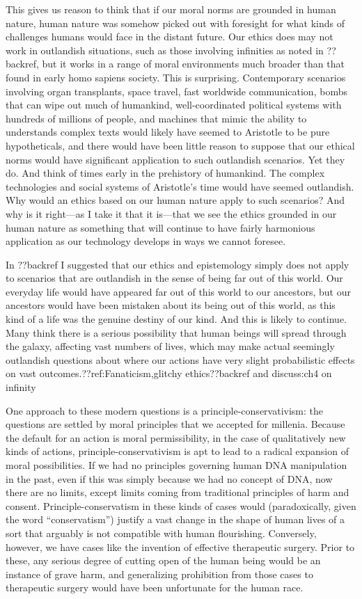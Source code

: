 This gives us reason to think that if our moral norms are grounded in human nature, human nature was somehow
picked out with foresight for what kinds of challenges humans would face in the distant future. Our ethics
does may not work in outlandish situations, such as those involving infinities as noted in ??backref, but it works in a
range of moral environments much broader than that found in early homo sapiens society. This is surprising. 
Contemporary scenarios involving organ transplants, space travel, fast worldwide communication, bombs that can wipe out
much of humankind, well-coordinated political systems with hundreds of millions of people, and machines that mimic 
the ability to understands complex texts 
would likely have seemed to Aristotle to be pure hypotheticals, and there would have been little reason to suppose
that our ethical norms would have significant application to such outlandish scenarios. Yet they do. And think of
times early in the prehistory of humankind. The complex technologies and social systems
of Aristotle's time would have seemed outlandish. Why would an ethics based on our human nature apply to such
scenarios? And why is it right---as I take it that it is---that we see the ethics grounded in our human nature 
as something that will continue to have fairly harmonious application as our technology develops in ways we cannot 
foresee. 

In ??backref I suggested that our ethics and epistemology simply does not apply to scenarios that are outlandish
in the sense of being far out of this world.  Our everyday life would have appeared far out of this world to our 
ancestors, but our ancestors would have been mistaken about its being out of this world, as this kind of a life 
was the genuine destiny of our kind. And this is likely to continue. Many think there is a serious possibility 
that human beings will spread through the galaxy, affecting vast numbers of lives, which may make actual seemingly 
outlandish questions about where our actions have very slight probabilistic effects on vast outcomes.??ref:Fanaticism,glitchy ethics??backref and discuss:ch4 on infinity

One approach to these modern questions is a principle-conservativism: the questions are settled by moral principles that we accepted
for millenia. Because the default for an action is moral permissibility, in the case of qualitatively new kinds of actions, 
principle-conservativism is apt to lead to a radical expansion of moral possibilities. If we had no principles governing human DNA
manipulation in the past, even if this was simply because we had no concept of DNA, now there are no limits, except limits coming
from traditional principles of harm and consent. Principle-conservatism in these kinds of cases would (paradoxically, given the word ``conservatism'') justify a vast 
change in the shape of human lives of a sort that arguably is not compatible with human flourishing. Conversely, however, we have 
cases like the invention of effective therapeutic surgery. Prior to these, any serious degree of cutting open of the human 
being would be an instance of grave harm, and generalizing prohibition from
those cases to therapeutic surgery would have been unfortunate for the human race. 

